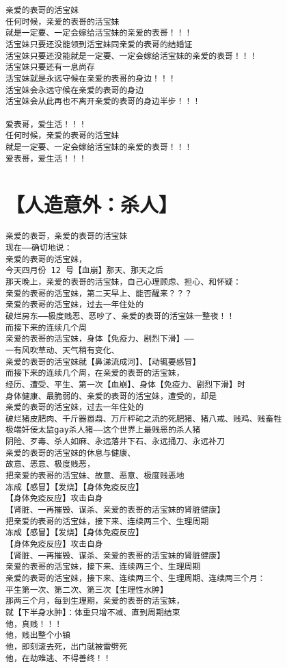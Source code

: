 \documentclass[9pt, b5paper]{article}
\begin{document}
\begin{verbatim}
亲爱的表哥的活宝妹
任何时候，亲爱的表哥的活宝妹
就是一定要、一定会嫁给活宝妹的亲爱的表哥！！！
活宝妹只要还没能领到活宝妹同亲爱的表哥的结婚证
活宝妹只要还没能就是一定要、一定会嫁给活宝妹的亲爱的表哥！！！
活宝妹只要还有一息尚存
活宝妹就是永远守候在亲爱的表哥的身边！！！
活宝妹会永远守候在亲爱的表哥的身边
活宝妹会从此再也不离开亲爱的表哥的身边半步！！！

爱表哥，爱生活！！！
任何时候，亲爱的表哥的活宝妹
就是一定要、一定会嫁给活宝妹的亲爱的表哥！！！
爱表哥，爱生活！！！
\end{verbatim}

\section{【人造意外：杀人】}
\label{sec-16}
\begin{verbatim}
亲爱的表哥，亲爱的表哥的活宝妹
现在——确切地说：
亲爱的表哥的活宝妹，
今天四月份 12 号【血崩】那天、那天之后
那天晚上，亲爱的表哥的活宝妹，自己心理顾虑、担心、和怀疑：
亲爱的表哥的活宝妹，第二天早上、能否醒来？？？
亲爱的表哥的活宝妹，过去一年住处的
破烂房东——极度贱恶、恶吵了、亲爱的表哥的活宝妹一整夜！！
而接下来的连续几个周
亲爱的表哥的活宝妹，身体【免疫力、剧烈下滑】——
一有风吹草动、天气稍有变化、
亲爱的表哥的活宝妹就【鼻涕流成河】、【动辄要感冒】
而接下来的连续几个周，在亲爱的表哥的活宝妹，
经历、遭受、平生、第一次【血崩】、身体【免疫力、剧烈下滑】时
身体健康、最脆弱的、亲爱的表哥的活宝妹，遭受的，却是
亲爱的表哥的活宝妹，过去一年住处的
破烂猪皮肥肉、千斤器嚣鼎、万斤秤砣之流的死肥猪、猪八戒、贱鸡、贱畜牲
极端奸佞太监gay杀人猪——这个世界上最贱恶的杀人猪
阴险、歹毒、杀人如麻、永远落井下石、永远捅刀、永远补刀
亲爱的表哥的活宝妹的休息与健康、
故意、恶意、极度贱恶，
把亲爱的表哥的活宝妹、故意、恶意、极度贱恶地
冻成【感冒】【发烧】【身体免疫反应】
【身体免疫反应】攻击自身
【肾脏、一再摧毁、谋杀、亲爱的表哥的活宝妹的肾脏健康】
把亲爱的表哥的活宝妹，接下来、连续两三个、生理周期
冻成【感冒】【发烧】【身体免疫反应】
【身体免疫反应】攻击自身
【肾脏、一再摧毁、谋杀、亲爱的表哥的活宝妹的肾脏健康】
亲爱的表哥的活宝妹，接下来、连续两三个、生理周期
亲爱的表哥的活宝妹，接下来、连续两三个、生理周期、连续两三个月：
平生第一次、第二次、第三次【生理性水肿】
那两三个月，每到生理期，亲爱的表哥的活宝妹，
就【下半身水肿】：体重只增不减、直到周期结束
他，真贱！！！
他，贱出整个小镇
他，即刻滚去死，出门就被雷劈死
他，在劫难逃、不得善终！！


\end{verbatim}
\end{document}
